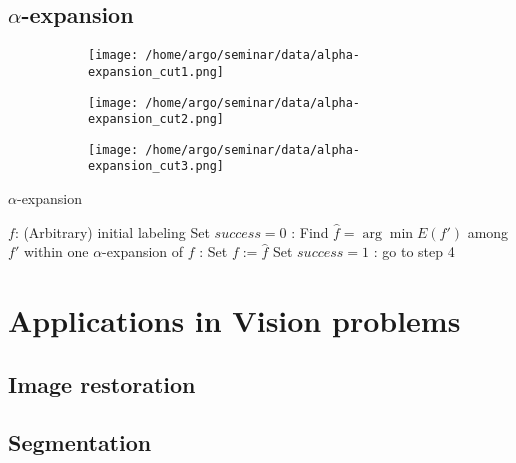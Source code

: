 \documentclass{scrartcl}[12pt, halfparskip]
\begin{document}
\subsection{$\alpha$-expansion}



\begin{figure}
	\begin{subfigure}{0.32\textwidth}
		\centering
		\texttt{[image: /home/argo/seminar/data/alpha-expansion\_cut1.png]}
		\caption{}
		\label{fig:alpha-expansion_Gab_cut1}
	\end{subfigure}
	\begin{subfigure}{0.32\textwidth}
		\centering
		\texttt{[image: /home/argo/seminar/data/alpha-expansion\_cut2.png]}
		\caption{}
		\label{fig:alpha-expansion_Gab_cut2}
	\end{subfigure}
	\begin{subfigure}{0.32\textwidth}
		\centering
		\texttt{[image: /home/argo/seminar/data/alpha-expansion\_cut3.png]}
		\caption{}
		\label{fig:alpha-expansion_Gab_cut3}
	\end{subfigure}
\label{fig:alpha-expansion_Gab_cuts}
\caption{}
\end{figure}



\begin{algorithm}[H]
\caption{$\alpha$-expansion}\label{alg:alpha-expansion}
\begin{algorithmic}[1]
	\State $f$: (Arbitrary) initial labeling 
	\State
	\State Set $success = 0$
	:
		\State Find $\hat{f} = \arg \min E(f')$ among $f'$ within one $\alpha$-expansion of $f$
		:
			\State Set $f := \hat{f}$
			\State Set $success = 1$
		\EndIf
	\EndFor
	:
		\State go to step 4
	\EndIf
	\State
	\State {}
\EndProcedure
\end{algorithmic}
\end{algorithm}


\section{Applications in Vision problems}
\subsection{Image restoration}
\subsection{Segmentation}
\end{document}
